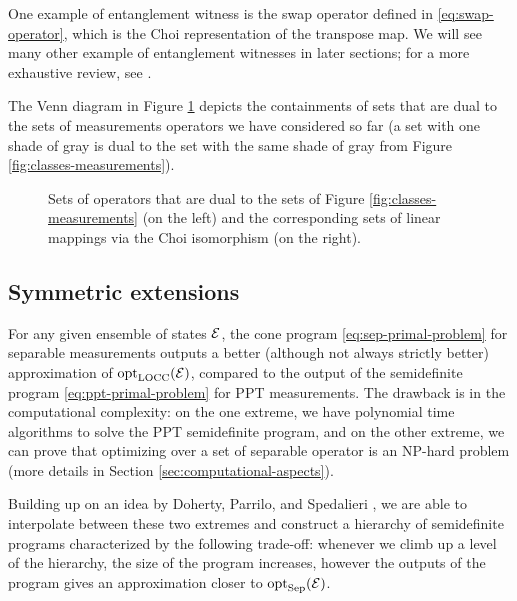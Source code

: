One example of entanglement witness is the swap operator defined in 
\eqref{eq:swap-operator}, which is the Choi representation
of the transpose map.
We will see many other example of entanglement witnesses in later sections;
for a more exhaustive review, see \cite{Chruscinski2014}.

The Venn diagram in Figure \ref{fig:measurements-dual} depicts the containments
of sets that are dual to the sets of measurements operators we have considered so far  
(a set with one shade of gray is dual to the set with the same shade of gray from
Figure \ref{fig:classes-measurements}).

\begin{figure}[!ht]
  \centering
    \begin{minipage}{0.5\textwidth}
      \centering
      \def\svgwidth{200pt}
      \scalebox{.75}{}
    \end{minipage}\hfill
    \begin{minipage}{0.5\textwidth}
      \centering
      \def\svgwidth{200pt}
      \scalebox{.75}{}
    \end{minipage}
    \caption{Sets of operators that are dual to the sets of Figure 
    \ref{fig:classes-measurements} (on the left) and the 
    corresponding sets of linear mappings via the Choi isomorphism (on the right).}
    \label{fig:measurements-dual}
\end{figure}

\subsection{Symmetric extensions}
\label{sec:symm-ext}
For any given ensemble of states $\mathcal{E}$, the cone program \eqref{eq:sep-primal-problem}
for separable measurements outputs a better (although not always strictly better) 
approximation of $\operatorname{opt}_{\mathrm{LOCC}}(\mathcal{E})$, compared to the output of the semidefinite 
program \eqref{eq:ppt-primal-problem} for PPT measurements.
The drawback is in the computational complexity: on the one extreme, we have 
polynomial time algorithms to solve the PPT semidefinite program, and on the other 
extreme, we can prove that optimizing over a set of separable operator is an NP-hard 
problem (more details in Section \ref{sec:computational-aspects}).

Building up on an idea by Doherty, Parrilo, and Spedalieri \cite{Doherty02,Doherty04}, 
we are able to interpolate between these two extremes and construct a hierarchy of
semidefinite programs characterized by the following trade-off: whenever we 
climb up a level of the hierarchy, the size of the program increases, however the
outputs of the program gives an approximation closer to $\operatorname{opt}_{\mathrm{Sep}}(\mathcal{E})$.

